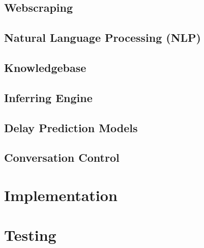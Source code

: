 \documentclass[11pt]{article}
\begin{document}
\subsection{Webscraping} \label{webscraping}

\subsection{Natural Language Processing (NLP)} \label{nlp}

\subsection{Knowledgebase} \label{knowledgebase}

\subsection{Inferring Engine} \label{inference-engine}

\subsection{Delay Prediction Models} \label{delay-prediction}

\subsection{Conversation Control} \label{conversation-control}

%

\section{Implementation} \label{implementation}

\section{Testing} \label{testing}
\end{document}
